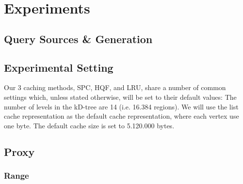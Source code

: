 \section{Experiments}



\subsection{Query Sources \& Generation}



\subsection{Experimental Setting}

% 

Our 3 caching methods, SPC, HQF, and LRU, share a number of common settings which, unless stated otherwise, will be set to their default values: 
The number of levels in the kD-tree are 14 (i.e. 16.384 regions). We will use the list cache representation as the default cache representation, where each vertex use one byte. The default cache size is set to 5.120.000 bytes.



\subsection{Proxy}\label{subsec:expProxy}


\subsubsection{Range}

